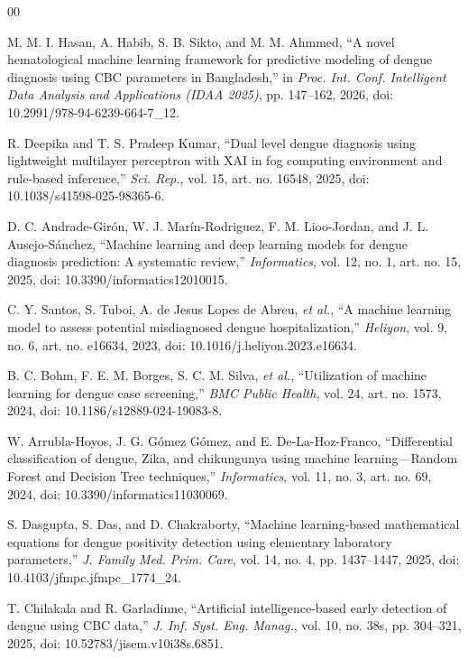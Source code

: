 \documentclass[conference]{IEEEtran}
\begin{document}
\begin{thebibliography}{00}
\footnotesize

M. M. I. Hasan, A. Habib, S. B. Sikto, and M. M. Ahmmed,
``A novel hematological machine learning framework for predictive
modeling of dengue diagnosis using CBC parameters in Bangladesh,''
in \emph{Proc. Int. Conf. Intelligent Data Analysis and Applications
(IDAA 2025)}, pp. 147--162, 2026,
doi: 10.2991/978-94-6239-664-7\_12.

R. Deepika and T. S. Pradeep Kumar,
``Dual level dengue diagnosis using lightweight multilayer perceptron
with XAI in fog computing environment and rule-based inference,''
\emph{Sci. Rep.}, vol. 15, art. no. 16548, 2025,
doi: 10.1038/s41598-025-98365-6.

D. C. Andrade-Gir\'on, W. J. Mar\'in-Rodriguez,
F. M. Lioo-Jordan, and J. L. Ausejo-S\'anchez,
``Machine learning and deep learning models for dengue diagnosis
prediction: A systematic review,''
\emph{Informatics}, vol. 12, no. 1, art. no. 15, 2025,
doi: 10.3390/informatics12010015.

C. Y. Santos, S. Tuboi, A. de Jesus Lopes de Abreu, \emph{et al.},
``A machine learning model to assess potential misdiagnosed dengue
hospitalization,''
\emph{Heliyon}, vol. 9, no. 6, art. no. e16634, 2023,
doi: 10.1016/j.heliyon.2023.e16634.

B. C. Bohm, F. E. M. Borges, S. C. M. Silva, \emph{et al.},
``Utilization of machine learning for dengue case screening,''
\emph{BMC Public Health}, vol. 24, art. no. 1573, 2024,
doi: 10.1186/s12889-024-19083-8.

W. Arrubla-Hoyos, J. G. G\'omez G\'omez, and
E. De-La-Hoz-Franco,
``Differential classification of dengue, Zika, and chikungunya using
machine learning---Random Forest and Decision Tree techniques,''
\emph{Informatics}, vol. 11, no. 3, art. no. 69, 2024,
doi: 10.3390/informatics11030069.

S. Dasgupta, S. Das, and D. Chakraborty,
``Machine learning-based mathematical equations for dengue positivity
detection using elementary laboratory parameters,''
\emph{J. Family Med. Prim. Care}, vol. 14, no. 4,
pp. 1437--1447, 2025,
doi: 10.4103/jfmpc.jfmpc\_1774\_24.

T. Chilakala and R. Garladinne,
``Artificial intelligence-based early detection of dengue using CBC
data,''
\emph{J. Inf. Syst. Eng. Manag.}, vol. 10, no. 38s,
pp. 304--321, 2025,
doi: 10.52783/jisem.v10i38s.6851.


\end{thebibliography}
\end{document}
